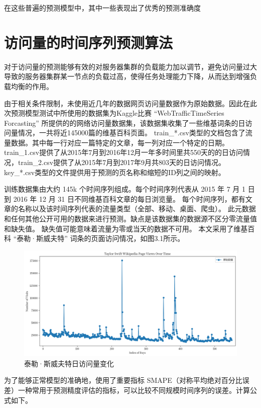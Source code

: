 在这些普遍的预测模型中，其中一些表现出了优秀的预测准确度

\section{访问量的时间序列预测算法}

对于访问量的预测能够有效的对服务器集群的负载能力加以调节，避免访问量过大导致的服务器集群某一节点的负载过高，使得任务处理能力下降，从而达到增强负载均衡的作用。

由于相关条件限制，未使用近几年的数据网页访问量数据作为原始数据。因此在此次预测模型测试中所使用的数据集为Kaggle比赛
“WebTrafficTimeSeries Forcasting”
所提供的的网络访问量数据集，该数据集收集了一些维基词条的日访问量情况，一共将近145000篇的维基百科页面。
train\_*.csv类型的文档包含了流量数据。其中每一行对应一篇特定的文章，每一列对应一个特定的日期。
train\_1.csv提供了从2015年7月到2016年12月一年多时间里共550天的的日访问情况，train\_2.csv提供了从2015年7月到2017年9月共803天的日访问情况。
key\_*.csv类型的文件提供用于预测的页名称和缩短的ID列之间的映射。

训练数据集由大约 145k 个时间序列组成。每个时间序列代表从 2015 年 7 月 1 日到 2016 年 12 月 31 日不同维基百科文章的每日浏览量。
每个时间序列，都有文章的名称以及该时间序列代表的流量类型（全部、移动、桌面、爬虫）。
此元数据和任何其他公开可用的数据来进行预测。缺点是该数据集的数据源不区分零流量值和缺失值。
缺失值可能意味着流量为零或当天的数据不可用。
本文采用了维基百科 “泰勒·斯威夫特” 词条的页面访问情况，如图3.1所示。

\begin{figure}[htb]
  \centering
  \includegraphics[width=\textwidth]{figures/taylor_source.png}
  \caption{泰勒·斯威夫特日访问量变化}
\end{figure}

为了能够正常模型的准确地，使用了重要指标 SMAPE（对称平均绝对百分比误差）一种常用于预测精度评估的指标，可以比较不同规模时间序列的误差。计算公式如下。

